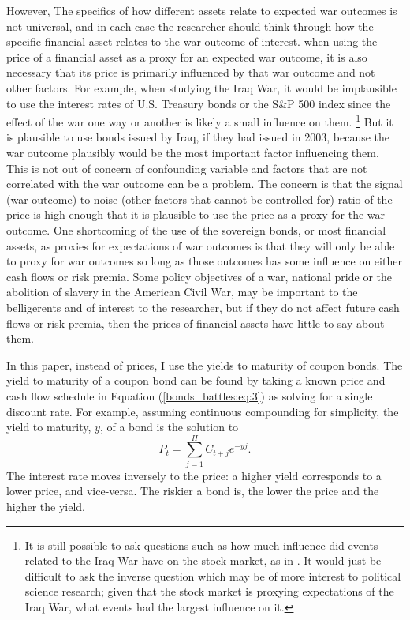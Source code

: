 However, The specifics of how different assets relate to expected war outcomes is not universal, and in each case the researcher should think through how the specific financial asset relates to the war outcome of interest.%
when using the price of a financial asset as a proxy for an expected war outcome, it is also necessary that its price is primarily influenced by that war outcome and not other factors.
For example, when studying the Iraq War, it would be implausible to use the interest rates of U.S. Treasury bonds or the S\&P 500 index since the effect of the war one way or another is likely a small influence on them.%
\footnote{
  It is still possible to ask questions such as how much influence did events related to the Iraq War have on the stock market, as in .
  It would just be difficult to ask the inverse question which may be of more interest to political science research; given that the stock market is proxying expectations of the Iraq War, what events had the largest influence on it.
 }
But it is plausible to use bonds issued by Iraq, if they had issued in 2003, because the war outcome plausibly would be the most important factor influencing them.
This is not out of concern of confounding variable and factors that are not correlated with the war outcome can be a problem.
The concern is that the signal (war outcome) to noise (other factors that cannot be controlled for) ratio of the price is high enough that it is plausible to use the price as a proxy for the war outcome.
One shortcoming of the use of the sovereign bonds, or most financial assets, as proxies for expectations of war outcomes is that they will only be able to proxy for war outcomes so long as those outcomes has some influence on either cash flows or risk premia. 
Some policy objectives of a war, \eg{}national pride or the abolition of slavery in the American Civil War, may be important to the belligerents and of interest to the researcher, but if they do not affect future cash flows or risk premia, then the prices of financial assets have little to say about them.

In this paper, instead of prices, I use the yields to maturity of coupon bonds. 
The yield to maturity of a coupon bond can be found by taking a known price and cash flow schedule in Equation (\ref{bonds_battles:eq:3}) as solving for a single discount rate.
For example, assuming continuous compounding for simplicity, the yield to maturity, $y$, of a bond is the solution to
\begin{equation}
  \label{bonds_battles:eq:5}
  P_{t} = \sum_{j = 1}^{H} C_{t + j} e^{-y j} \text{.}
\end{equation}
The interest rate moves inversely to the price: a higher yield corresponds to a lower price, and vice-versa.
The riskier a bond is, the lower the price and the higher the yield.





